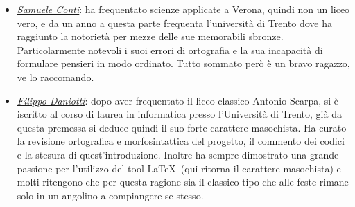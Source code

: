 \documentclass[class=book, crop=false, oneside]{standalone}
\begin{document}
\begin{minipage}{.3\textwidth}
	{%
		\setlength{\fboxsep}{0pt}%
		\setlength{\fboxrule}{1pt}%
	}%
\end{minipage}
\hspace{.01\textwidth}
\begin{minipage}{.7\textwidth}
    \begin{itemize}
		\item \emph{\href{https://github.com/Samaretas}{Samuele Conti}}: ha frequentato scienze applicate a Verona, quindi non un liceo vero, e da un anno a questa parte frequenta l'università di Trento dove ha raggiunto la notorietà per mezze delle sue memorabili sbronze. Particolarmente notevoli i suoi errori di ortografia e la sua incapacità di formulare pensieri in modo ordinato. Tutto sommato però è un bravo ragazzo, ve lo raccomando.
	\end{itemize}
\end{minipage}
\vskip 20pt
\begin{minipage}{.6\textwidth}
    \begin{itemize}
		\item \emph{\href{https://github.com/filippodaniotti}{Filippo Daniotti}}: dopo aver frequentato il liceo classico Antonio Scarpa, si è iscritto al corso di laurea in informatica presso l'Università di Trento, già da questa premessa si deduce quindi il suo forte carattere masochista. Ha curato la revisione ortografica e morfosintattica del progetto, il commento dei codici e la stesura di quest'introduzione. Inoltre ha sempre dimostrato una grande passione per l'utilizzo del tool \LaTeX\ (qui ritorna il carattere masochista) e molti ritengono che per questa ragione sia il classico tipo che alle feste rimane solo in un angolino a compiangere se stesso.
	\end{itemize}
\end{minipage}
\end{document}
